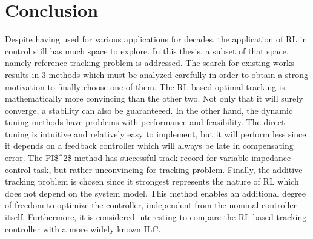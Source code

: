 \chapter{Conclusion}
Despite having used for various applications for decades, the application of \ac {RL} in control still has much space to explore. In this thesis, a subset of that space, namely reference tracking problem is addressed. The search for existing works results in 3 methods which must be analyzed carefully in order to obtain a strong motivation to finally choose one of them. The \ac {RL}-based optimal tracking is mathematically more convincing than the other two. Not only that it will surely converge, a stability can also be guaranteeed. In the other hand, the dynamic tuning methods have problems with performance and feasibility. The direct tuning is intuitive and relatively easy to implement, but it will perform less since it depends on a feedback controller which will always be late in compensating error. The \ac{PI$^2$} method has successful track-record for variable impedance control task, but rather unconvincing for tracking problem. Finally, the additive tracking problem is chosen since it strongest represents the nature of \ac {RL} which does not depend on the system model. This method enables an additional degree of freedom to optimize the controller, independent from the nominal controller itself. Furthermore, it is considered interesting to compare the \ac{RL}-based tracking controller with a more widely known \ac{ILC}.